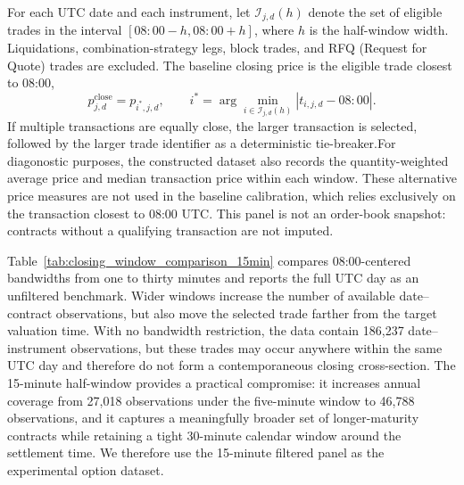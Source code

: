 For each UTC date and each instrument, let $\mathcal{I}_{j,d}(h)$ denote the set of eligible trades in the interval $[08{:}00-h,08{:}00+h]$, where $h$ is the half-window width. Liquidations, combination-strategy legs, block trades, and RFQ (Request for Quote) trades are excluded. The baseline closing price is the eligible trade closest to 08:00,
\begin{equation}
 p^{\mathrm{close}}_{j,d}
 =p_{i^{*},j,d}, \qquad
 i^{*}=\arg\min_{i\in\mathcal{I}_{j,d}(h)}
 \left|t_{i,j,d}-08{:}00\right|.
 \label{eq:closest_closing_trade}
\end{equation}
If multiple transactions are equally close, the larger transaction is selected, followed by the larger trade identifier as a deterministic tie-breaker.For diagonostic purposes, the constructed dataset also records the quantity-weighted average price and median transaction price within each window. These alternative price measures are not used in the baseline calibration, which relies exclusively on the transaction closest to 08:00 UTC. This panel is not an order-book snapshot: contracts without a qualifying transaction are not imputed.

Table~\ref{tab:closing_window_comparison_15min} compares 08:00-centered bandwidths from one to thirty minutes and reports the full UTC day as an unfiltered benchmark. Wider windows increase the number of available date--contract observations, but also move the selected trade farther from the target valuation time. With no bandwidth restriction, the data contain 186,237 date--instrument observations, but these trades may occur anywhere within the same UTC day and therefore do not form a contemporaneous closing cross-section. The 15-minute half-window provides a practical compromise: it increases annual coverage from 27,018 observations under the five-minute window to 46,788 observations, and it captures a meaningfully broader set of longer-maturity contracts while retaining a tight 30-minute calendar window around the settlement time. We therefore use the 15-minute filtered panel as the experimental option dataset.




